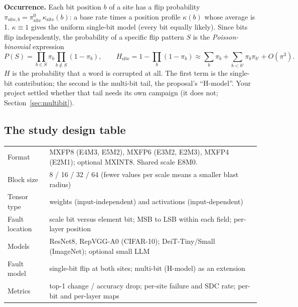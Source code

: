 \textbf{Occurrence.} Each bit position $b$ of a site has a flip probability $\pi_{\mathrm{site},b}=\pi^{0}_{\mathrm{site}}\,\kappa_{\mathrm{site}}(b)$: a base rate times a position profile $\kappa(b)$ whose average is 1. $\kappa\equiv1$ gives the uniform single-bit model (every bit equally likely). Since bits flip independently,
the probability of a specific flip pattern $S$ is the \emph{Poisson-binomial} expression
\[
P(S)=\prod_{b\in S}\pi_b\prod_{b\notin S}(1-\pi_b),
\qquad
H_{\mathrm{site}}=1-\prod_b(1-\pi_b)\approx\sum_b\pi_b+\sum_{b<b'}\pi_b\pi_{b'}+O(\pi^3).
\]
$H$ is the probability that a word is corrupted at all. The first term is the single-bit contribution; the second is the multi-bit tail, the proposal's ``H-model''. Your project settled whether that tail needs its own campaign (it does not; Section~\ref{sec:multibit}).

\subsection{The study design table}
\begin{center}
\small
\begin{tabular}{@{}lp{11.5cm}@{}}
\toprule
Format & MXFP8 (E4M3, E5M2), MXFP6 (E3M2, E2M3), MXFP4 (E2M1); optional MXINT8. Shared scale E8M0. \\
Block size & 8 / 16 / 32 / 64 (fewer values per scale means a smaller blast radius) \\
Tensor type & weights (input-independent) and activations (input-dependent) \\
Fault location & scale bit versus element bit; MSB to LSB within each field; per-layer position \\
Models & ResNet8, RepVGG-A0 (CIFAR-10); DeiT-Tiny/Small (ImageNet); optional small LLM \\
Fault model & single-bit flip at both sites; multi-bit (H-model) as an extension \\
Metrics & top-1 change / accuracy drop; per-site failure and SDC rate; per-bit and per-layer maps \\
\bottomrule
\end{tabular}
\end{center}

